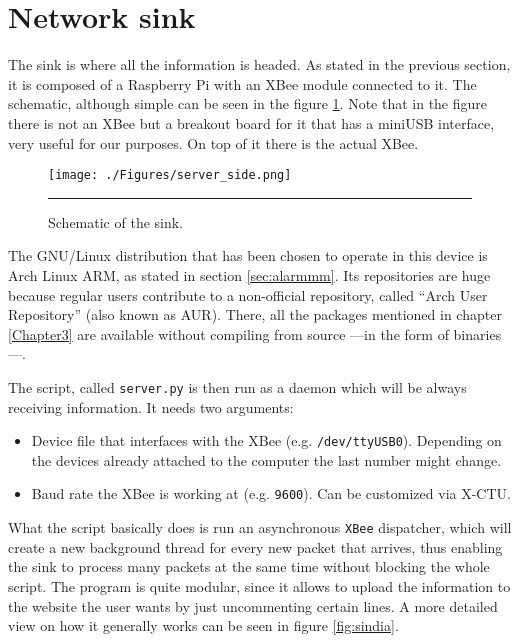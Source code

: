 
\section{Network sink}

The sink is where all the information is headed. As stated in the previous section, it is composed of a Raspberry Pi with an XBee module connected to it. The schematic, although simple can be seen in the figure \ref{fig:sinkrpi}. Note that in the figure there is not an XBee but a breakout board for it that has a miniUSB interface, very useful for our purposes. On top of it there is the actual XBee\textregistered{}.

\begin{figure}[htbp]
    \centering
        \texttt{[image: ./Figures/server\_side.png]}
        \rule{35em}{0.5pt}
    \caption[Raspberry Pi based sink]{Schematic of the sink.}
    \label{fig:sinkrpi}
\end{figure}

The GNU/Linux distribution that has been chosen to operate in this device is Arch Linux ARM, as stated in section \ref{sec:alarmmm}. Its repositories are huge because regular users contribute to a non-official repository, called ``Arch User Repository'' (also known as AUR). There, all the packages mentioned in chapter \ref{Chapter3} are available without compiling from source ---in the form of binaries---.

The script, called \texttt{server.py} is then run as a daemon which will be always receiving information. It needs two arguments:

\begin{itemize}
    \item Device file that interfaces with the XBee\textregistered{} (e.g. \texttt{/dev/ttyUSB0}). Depending on the devices already attached to the computer the last number might change.
    \item Baud rate the XBee\textregistered{} is working at (e.g. \texttt{9600}). Can be customized via X-CTU.
\end{itemize}

What the script basically does is run an asynchronous \texttt{XBee} dispatcher, which will create a new background thread for every new packet that arrives, thus enabling the sink to process many packets at the same time without blocking the whole script. The program is quite modular, since it allows to upload the information to the website the user wants by just uncommenting certain lines. A more detailed view on how it generally works can be seen in figure \ref{fig:sindia}.

